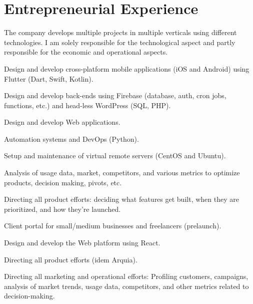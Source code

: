 \documentclass[]{robertino-cv}
\begin{document}
\begin{minipage}[t]{0.50\textwidth} 


\section{Entrepreneurial Experience}

The company develops multiple projects in multiple verticals using different technologies. I am solely responsible for the technological aspect and partly responsible for the economic and operational aspects.
\begin{tightemize}
\item Design and develop cross-platform mobile applications (iOS and Android) using Flutter (Dart, Swift, Kotlin).
\item Design and develop back-ends using Firebase (database, auth, cron jobs, functions, etc.) and head-less WordPress (SQL, PHP). 
\item Design and develop Web applications.
\item Automation systems and DevOps (Python).
\item Setup and maintenance of virtual remote servers (CentOS and Ubuntu).
\item Analysis of usage data, market, competitors, and various metrics to optimize products, decision making, pivots, etc.
\item Directing all product efforts: deciding what features get built, when they are prioritized, and how they're launched.
\end{tightemize}
\sectionsep


Client portal for small/medium businesses and freelancers (prelaunch).
\begin{tightemize}
\item Design and develop the Web platform using React.
\item Directing all product efforts (idem Arquia).
\item Directing all marketing and operational efforts: Profiling customers, campaigns, analysis of market trends, usage data, competitors, and other metrics related to decision-making.
\end{tightemize}
\sectionsep



\end{minipage}
\end{document}
